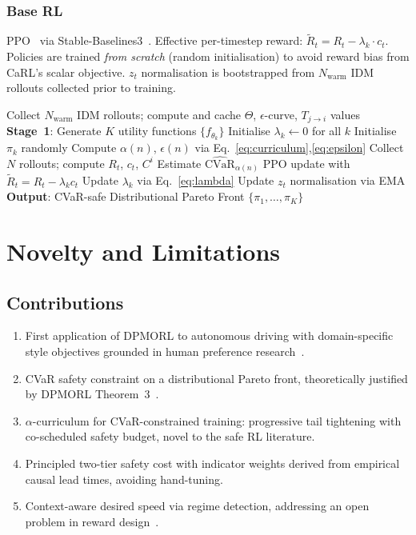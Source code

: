 \documentclass[conference]{IEEEtran}
\begin{document}
\subsubsection{Base RL}
PPO~\cite{PPO2017} via Stable-Baselines3~\cite{SB3_2021}. Effective
per-timestep reward: $\tilde{R}_{t}=R_{t}-\lambda_{k}\cdot c_{t}$.
Policies are trained \emph{from scratch} (random initialisation) to
avoid reward bias from CaRL's scalar objective. $z_{t}$ normalisation
is bootstrapped from $N_{\text{warm}}$ IDM rollouts collected prior
to training.

\begin{algorithm}
\caption{PRISM Training}
\begin{algorithmic}[1]
\STATE Collect $N_{\text{warm}}$ IDM rollouts; compute and
       cache $\Theta$, $\epsilon$-curve, $T_{j\to i}$ values
\STATE \textbf{Stage~1}: Generate $K$ utility functions
       $\{f_{\theta_{k}}\}$
\STATE Initialise $\lambda_{k}\leftarrow0$ for all $k$
  \STATE Initialise $\pi_{k}$ randomly
    \STATE Compute $\alpha(n)$, $\epsilon(n)$ via
           Eq.~\eqref{eq:curriculum},\eqref{eq:epsilon}
    \STATE Collect $N$ rollouts; compute $R_{t}$, $c_{t}$, $C^{i}$
    \STATE Estimate $\widehat{\text{CVaR}}_{\alpha(n)}$
    \STATE PPO update with $\tilde{R}_{t}=R_{t}-\lambda_{k}c_{t}$
    \STATE Update $\lambda_{k}$ via Eq.~\eqref{eq:lambda}
    \STATE Update $z_{t}$ normalisation via EMA
  \ENDFOR
\ENDFOR
\STATE \textbf{Output}: CVaR-safe Distributional Pareto Front
       $\{\pi_{1},\ldots,\pi_{K}\}$
\end{algorithmic}
\end{algorithm}

\section{Novelty and Limitations}\label{sec:novelty}

\subsection{Contributions}

\begin{enumerate}
  \item First application of DPMORL to autonomous driving with
    domain-specific style objectives grounded in human preference
    research~\cite{Yusof2016,NatDriving2023}.
  \item CVaR safety constraint on a distributional Pareto front,
    theoretically justified by DPMORL Theorem~3~\cite{DPMORL2023}.
  \item $\alpha$-curriculum for CVaR-constrained training: progressive
    tail tightening with co-scheduled safety budget, novel to the
    safe RL literature.
  \item Principled two-tier safety cost with indicator weights derived
    from empirical causal lead times, avoiding hand-tuning.
  \item Context-aware desired speed via regime detection, addressing
    an open problem in reward design~\cite{RewardReview2024}.
\end{enumerate}
\end{document}
